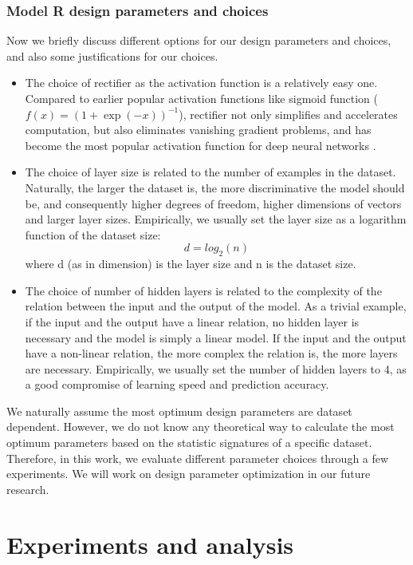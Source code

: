 \documentclass[book,12pt]{WSUThesis}
\theoremstyle{definition}
\begin{document}
\subsection{Model R design parameters and choices}
Now we briefly discuss different options for our design parameters and choices,
and also some justifications for our choices.
\begin{itemize}
	\item The choice of rectifier as the activation function is a relatively easy one.
	Compared to earlier popular activation functions like sigmoid function
	($ f(x) = (1 + \exp(-x))^{-1} $),
	rectifier not only simplifies and accelerates computation,
	but also eliminates vanishing gradient problems,
	and has become the most popular activation function
	for deep neural networks \cite{lecun2015deep}.
	\item The choice of layer size is related to
	the number of examples in the dataset.
	Naturally, the larger the dataset is,
	the more discriminative the model should be,
	and consequently higher degrees of freedom,
	higher dimensions of vectors and larger layer sizes.
	Empirically, we usually set the layer size as a logarithm function of the dataset size:
	\[d = log_2(n)\]
	where d (as in dimension) is the layer size and n is the dataset size.
	\item The choice of number of hidden layers is related to the complexity of the relation between the input and the output of the model.
	As a trivial example, if the input and the output have a linear relation,
	no hidden layer is necessary and the model is simply a linear model.
	If the input and the output have a non-linear relation,
	the more complex the relation is, the more layers are necessary.
	Empirically, we usually set the number of hidden layers to 4,
	as a good compromise of learning speed and prediction accuracy.
\end{itemize}
We naturally assume the most optimum design parameters are dataset dependent.
However, we do not know any theoretical way to calculate the most optimum parameters based on the statistic signatures of a specific dataset.
Therefore, in this work, we evaluate different parameter choices through a few experiments.
We will work on design parameter optimization in our future research.

\chapter{Experiments and analysis}
\end{document}
